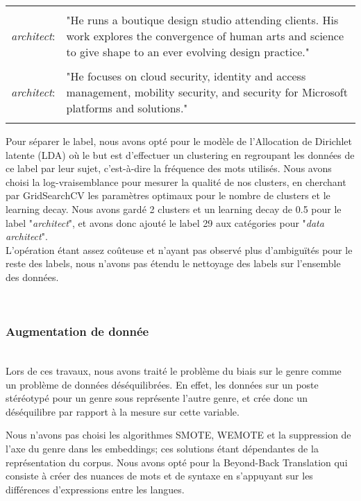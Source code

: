 \begin{longtable}{l p{4in}}
    &\\
    \textit{architect}: &"He runs a boutique design studio attending clients. His work explores the convergence of human arts and science to give shape to an ever evolving design practice." \\
    &\\
    \textit{architect}: &"He focuses on cloud security, identity and access management, mobility security, and security for Microsoft platforms and solutions."\\
    &
\end{longtable}

Pour séparer le label, nous avons opté pour le modèle de l'Allocation de Dirichlet latente (LDA) où le but est d'effectuer un clustering en regroupant les données de ce label par leur sujet, c'est-à-dire la fréquence des mots utilisés. Nous avons choisi la log-vraisemblance pour mesurer la qualité de nos clusters, en cherchant par GridSearchCV les paramètres optimaux pour le nombre de clusters et le learning decay. Nous avons gardé \textsf{2} clusters et un learning decay de \textsf{0.5} pour le label "\textit{architect}", et avons donc ajouté le label 29 aux catégories pour "\textit{data architect}".\\
L'opération étant assez coûteuse et n'ayant pas observé plus d'ambiguïtés pour le reste des labels, nous n'avons pas étendu le nettoyage des labels sur l'ensemble des données.

\hfill\\
\subsubsection{Augmentation de donnée}
\hfill\\
Lors de ces travaux, nous avons traité le problème du biais sur le genre comme un problème de données déséquilibrées. En effet, les données sur un poste stéréotypé pour un genre sous représente l'autre genre, et crée donc un déséquilibre par rapport à la mesure sur cette variable.

Nous n'avons pas choisi les algorithmes SMOTE, WEMOTE et la suppression de l'axe du genre dans les embeddings; ces solutions étant dépendantes de la représentation du corpus. Nous avons opté pour la Beyond-Back Translation  qui consiste à créer des nuances de mots et de syntaxe en s'appuyant sur les différences d'expressions entre les langues.

